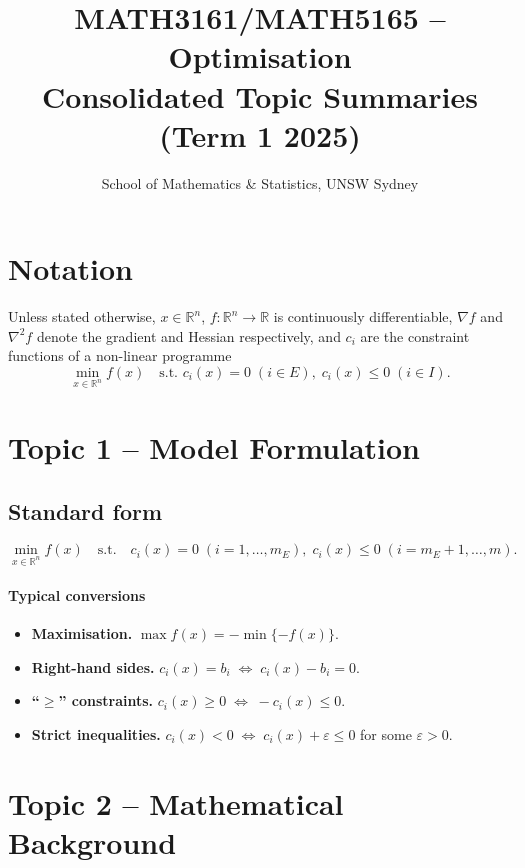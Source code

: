 \documentclass[12pt]{article}
\title{MATH3161/MATH5165 – Optimisation\\\large Consolidated Topic Summaries (Term 1 2025)}
\author{School of Mathematics \& Statistics, UNSW Sydney}
\date{}
\begin{document}
\maketitle
\tableofcontents
\newpage

\section*{Notation}
Unless stated otherwise, \(x\in\mathbb R^n\), \(f:\mathbb R^n\to\mathbb R\) is
continuously differentiable, \(\nabla f\) and \(\nabla^2 f\) denote the gradient
and Hessian respectively, and \(c_i\) are the constraint functions of a
non-linear programme
\[
\min_{x\in\mathbb R^n} f(x)\quad
\text{s.t. } c_i(x)=0\;(i\in E),\;
c_i(x)\le0\;(i\in I).
\]

\section{Topic 1 – Model Formulation}

\subsection{Standard form}
\[
\min_{x\in\mathbb R^n} f(x)\quad\text{s.t.}\quad
c_i(x)=0\;(i=1,\dots,m_E),\;
c_i(x)\le0\;(i=m_E\!+\!1,\dots,m).
\]

\paragraph{Typical conversions}
\begin{itemize}
  \item {\bf Maximisation.}\; \(\max f(x)= -\min\{-f(x)\}\).
  \item {\bf Right-hand sides.}\; \(c_i(x)=b_i\;\Longleftrightarrow\;c_i(x)-b_i=0\).
  \item {\bf ``\(\ge\)'' constraints.}\; \(c_i(x)\ge0\;\Longleftrightarrow\;-c_i(x)\le0\).
  \item {\bf Strict inequalities.}\; \(c_i(x)<0\;\Longleftrightarrow\;c_i(x)+\varepsilon\le0\)
        for some \(\varepsilon>0\).
\end{itemize}

\section{Topic 2 – Mathematical Background}
\end{document}
